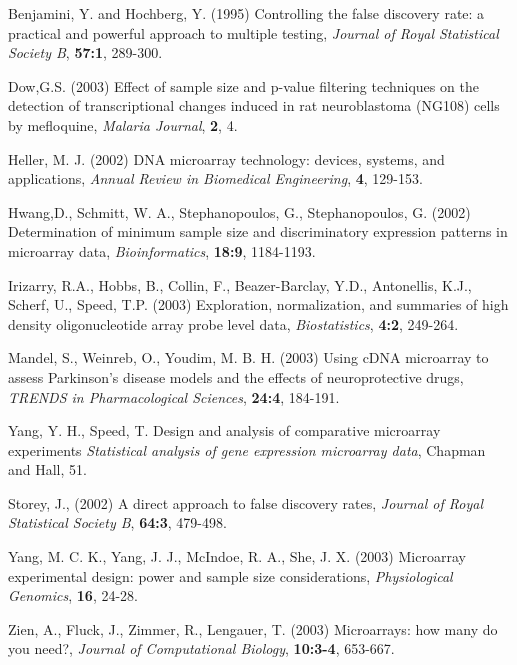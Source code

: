 \documentclass{bioinfo}
\begin{document}
\begin{thebibliography}{}

 Benjamini, Y.
  and Hochberg, Y. (1995) Controlling the false discovery rate: a
  practical and powerful approach to multiple testing, {\it Journal
  of Royal Statistical Society B}, {\bf 57:1}, 289-300.

 Dow,G.S. (2003) Effect of sample size
  and p-value filtering techniques on the detection of
  transcriptional changes induced in rat neuroblastoma (NG108) cells
  by mefloquine, {\it Malaria Journal}, {\bf 2}, 4.

 Heller, M. J. (2002) {DNA
  microarray technology: devices, systems, and applications}, {\it
  Annual Review in Biomedical Engineering}, {\bf 4}, 129-153.

 Hwang,D., Schmitt,
  W. A., Stephanopoulos, G., Stephanopoulos, G. (2002) Determination
  of minimum sample size and discriminatory expression patterns in
  microarray data, {\it Bioinformatics}, {\bf 18:9}, 1184-1193.

 Irizarry, R.A.,
  Hobbs, B., Collin, F., Beazer-Barclay, Y.D., Antonellis, K.J.,
  Scherf, U., Speed, T.P. (2003) Exploration, normalization, and
  summaries of high density oligonucleotide array probe level data,
  {\it Biostatistics}, {\bf 4:2}, 249-264.

 Mandel, S.,  Weinreb,
  O., Youdim, M. B. H. (2003) Using cDNA microarray to assess
  Parkinson's disease models and the effects of neuroprotective
  drugs, {\it TRENDS in Pharmacological Sciences}, {\bf 24:4},
  184-191.

 Yang, Y. H., Speed, T.
  {Design and analysis of comparative microarray experiments \it
  Statistical analysis of gene expression microarray data}, {Chapman
  and Hall}, 51.

 Storey, J., (2002)
  A direct approach to false discovery rates, {\it Journal of Royal
  Statistical Society B}, {\bf 64:3}, 479-498.

 Yang, M. C. K., Yang,
  J. J., McIndoe, R. A., She, J. X. (2003) Microarray experimental
  design: power and sample size considerations, {\it Physiological
  Genomics}, {\bf 16}, 24-28.

 Zien, A., Fluck, J.,
  Zimmer, R., Lengauer, T. (2003) Microarrays: how many do you
  need?, {\it Journal of Computational Biology}, {\bf 10:3-4},
  653-667.

\end{thebibliography}
\end{document}
